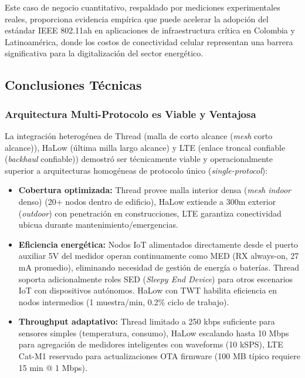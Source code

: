 Este caso de negocio cuantitativo, respaldado por mediciones experimentales reales, proporciona evidencia empírica que puede acelerar la adopción del estándar IEEE 802.11ah en aplicaciones de infraestructura crítica en Colombia y Latinoamérica, donde los costos de conectividad celular representan una barrera significativa para la digitalización del sector energético.

\subsection{Conclusiones Técnicas}

\subsubsection{Arquitectura Multi-Protocolo es Viable y Ventajosa}

La integración heterogénea de Thread (malla de corto alcance (\textit{mesh} corto alcance)), HaLow (última milla largo alcance) y LTE (enlace troncal confiable (\textit{backhaul} confiable)) demostró ser técnicamente viable y operacionalmente superior a arquitecturas homogéneas de protocolo único (\textit{single-protocol}):

\begin{itemize}
\item \textbf{Cobertura optimizada:} Thread provee malla interior densa (\textit{mesh indoor} denso) (20+ nodos dentro de edificio), HaLow extiende a 300m exterior (\textit{outdoor}) con penetración en construcciones, LTE garantiza conectividad ubicua durante mantenimiento/emergencias.
\item \textbf{Eficiencia energética:} Nodos IoT alimentados directamente desde el puerto auxiliar 5V del medidor operan continuamente como MED (RX always-on, 27 mA promedio), eliminando necesidad de gestión de energía o baterías. Thread soporta adicionalmente roles SED (\textit{Sleepy End Device}) para otros escenarios IoT con dispositivos autónomos. HaLow con TWT habilita eficiencia en nodos intermedios (1 muestra/min, 0.2\% ciclo de trabajo).
\item \textbf{Throughput adaptativo:} Thread limitado a 250 kbps suficiente para sensores simples (temperatura, consumo), HaLow escalando hasta 10 Mbps para agregación de medidores inteligentes con waveforms (10 kSPS), LTE Cat-M1 reservado para actualizaciones OTA firmware (100 MB típico requiere 15 min @ 1 Mbps).
\end{itemize}

